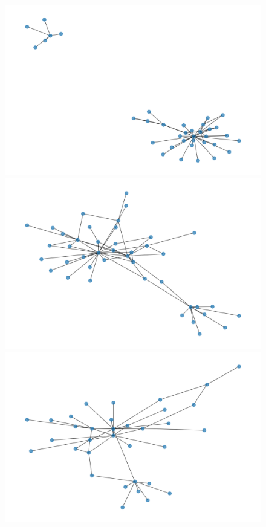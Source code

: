 \begin{figure}[htbp]
\begin{minipage}{.24\textwidth}
	\end{minipage}
	\begin{minipage}{.24\textwidth}
		\centering
		\includegraphics[width=1\linewidth]{problem_02/network_phase7}
	\end{minipage}
	\begin{minipage}{.24\textwidth}
		\centering
		\includegraphics[width=1\linewidth]{problem_02/network_phase8}
	\end{minipage}
	\begin{minipage}{.24\textwidth}
		\centering
		\includegraphics[width=1\linewidth]{problem_02/network_phase9}

\end{minipage}
\end{figure}
